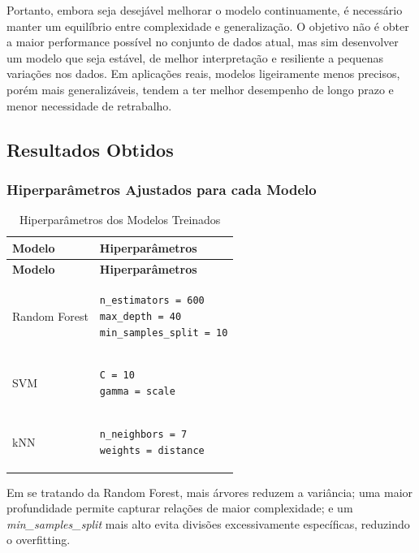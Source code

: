 \documentclass[english, spanish, brazilian]{RBIEarticle} %
\begin{document}
Portanto, embora seja desejável melhorar o modelo continuamente, é necessário manter um equilíbrio entre complexidade e generalização. O objetivo não é obter a maior performance possível no conjunto de dados atual, mas sim desenvolver um modelo que seja estável, de melhor interpretação e resiliente a pequenas variações nos dados. Em aplicações reais, modelos ligeiramente menos precisos, porém mais generalizáveis, tendem a ter melhor desempenho de longo prazo e menor necessidade de retrabalho.

\subsection{Resultados Obtidos}

\subsubsection{Hiperparâmetros Ajustados para cada Modelo}

\begin{longtable}{m{4cm} m{10cm}}
\caption{Hiperparâmetros dos Modelos Treinados}\\
\toprule
\textbf{Modelo} & \textbf{Hiperparâmetros} \\
\midrule
\endfirsthead
\toprule
\textbf{Modelo} & \textbf{Hiperparâmetros} \\
\midrule
\endhead

Random Forest &
\begin{verbatim}
n_estimators = 600
max_depth = 40
min_samples_split = 10
\end{verbatim}
\\[0.2cm]

SVM &
\begin{verbatim}
C = 10
gamma = scale
\end{verbatim}
\\[0.2cm]

kNN &
\begin{verbatim}
n_neighbors = 7
weights = distance
\end{verbatim}
\\

\bottomrule
\end{longtable}

Em se tratando da Random Forest, mais árvores reduzem a variância; uma maior profundidade permite capturar relações de maior complexidade; e um \textit{min\_samples\_split} mais alto evita divisões excessivamente específicas, reduzindo o overfitting.
\end{document}
